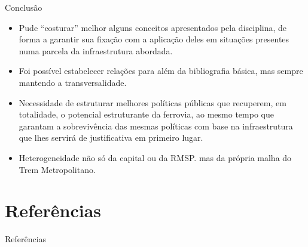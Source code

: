 \documentclass[spectratio=169, portuguese]{beamer}
\begin{document}
\begin{frame}{Conclusão}
	
	\begin{itemize}
	\item Pude ``costurar'' melhor alguns conceitos apresentados pela disciplina, de forma a garantir sua fixação com a aplicação deles em situações presentes numa parcela da infraestrutura abordada.
	\item Foi possível estabelecer relações para além da bibliografia básica, mas sempre mantendo a transversalidade.
	\item Necessidade de estruturar melhores políticas públicas que recuperem, em totalidade, o potencial estruturante da ferrovia, ao mesmo tempo que garantam a sobrevivência das mesmas políticas com base na infraestrutura que lhes servirá de justificativa em primeiro lugar.
	\item Heterogeneidade não só da capital ou da RMSP. mas da própria malha do Trem Metropolitano.
	\end{itemize}

\end{frame}


\section{Referências}


\begin{frame}[allowframebreaks]{Referências}
	
\end{frame}

\end{document}
